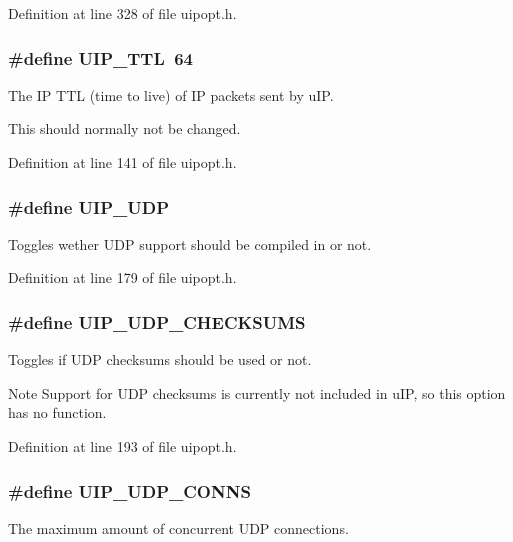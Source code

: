Definition at line 328 of file uipopt.h.

\hypertarget{group__uipopt_gab61381673de27f31848c5396bf0b338e}{
\subsubsection[{UIP\_\-TTL}]{\setlength{\rightskip}{0pt plus 5cm}\#define UIP\_\-TTL~64}}
\label{group__uipopt_gab61381673de27f31848c5396bf0b338e}
The IP TTL (time to live) of IP packets sent by uIP.

This should normally not be changed. 

Definition at line 141 of file uipopt.h.

\hypertarget{group__uipopt_gadcf372ff9748996f7c05e9822a615384}{
\subsubsection[{UIP\_\-UDP}]{\setlength{\rightskip}{0pt plus 5cm}\#define UIP\_\-UDP}}
\label{group__uipopt_gadcf372ff9748996f7c05e9822a615384}
Toggles wether UDP support should be compiled in or not. 

Definition at line 179 of file uipopt.h.

\hypertarget{group__uipopt_ga92f3344ec8ca46893163399c89fafed5}{
\subsubsection[{UIP\_\-UDP\_\-CHECKSUMS}]{\setlength{\rightskip}{0pt plus 5cm}\#define UIP\_\-UDP\_\-CHECKSUMS}}
\label{group__uipopt_ga92f3344ec8ca46893163399c89fafed5}
Toggles if UDP checksums should be used or not.

\begin{DoxyNote}{Note}
Support for UDP checksums is currently not included in uIP, so this option has no function. 
\end{DoxyNote}


Definition at line 193 of file uipopt.h.

\hypertarget{group__uipopt_ga196379ceb1219a99f4495e41ccc9bbfb}{
\subsubsection[{UIP\_\-UDP\_\-CONNS}]{\setlength{\rightskip}{0pt plus 5cm}\#define UIP\_\-UDP\_\-CONNS}}
\label{group__uipopt_ga196379ceb1219a99f4495e41ccc9bbfb}
The maximum amount of concurrent UDP connections. 

